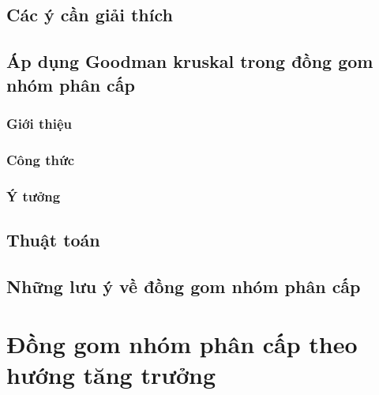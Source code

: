 	\subsection{Các ý cần giải thích}
	
	\subsection{Áp dụng Goodman kruskal trong đồng gom nhóm phân cấp}
	
		\subsubsection{Giới thiệu}		
		
		\subsubsection{Công thức}
		
		\subsubsection{Ý tưởng}
	\subsection{Thuật toán}
	
	\subsection{Những lưu ý về đồng gom nhóm phân cấp}
		
\section{Đồng gom nhóm phân cấp theo hướng tăng trưởng}


